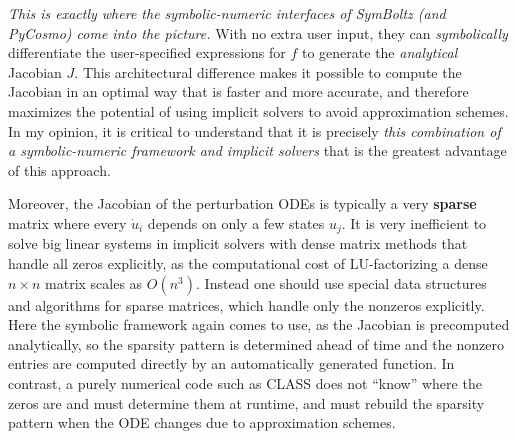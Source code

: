\documentclass[USenglish, thumbmarks]{uiophdthesis} %
\begin{document}
\emph{This is exactly where the symbolic-numeric interfaces of SymBoltz (and PyCosmo) come into the picture.}
With no extra user input,
they can \emph{symbolically} differentiate the user-specified expressions for $f$
to generate the \emph{analytical} Jacobian $J$.
This architectural difference
makes it possible to compute the Jacobian in an optimal way that is faster and more accurate,
and therefore maximizes the potential of using implicit solvers to avoid approximation schemes.
In my opinion, it is critical to understand that it is precisely
\emph{this combination of a symbolic-numeric framework and implicit solvers}
that is the greatest advantage of this approach.

Moreover, the Jacobian of the perturbation ODEs is typically a very \textbf{sparse} matrix
where every $\dot{u}_i$ depends on only a few states $u_j$.
It is very inefficient to solve big linear systems in implicit solvers with dense matrix methods that handle all zeros explicitly,
as the computational cost of LU-factorizing a dense $n \times n$ matrix scales as $O(n^3)$.
Instead one should use special data structures and algorithms for sparse matrices,
which handle only the nonzeros explicitly.
Here the symbolic framework again comes to use, as the Jacobian is precomputed analytically,
so the sparsity pattern is determined ahead of time and the nonzero entries are computed directly by an automatically generated function.
In contrast, a purely numerical code such as CLASS does not \enquote{know} where the zeros are and must determine them at runtime,
and must rebuild the sparsity pattern when the ODE changes due to approximation schemes.

\end{document}
